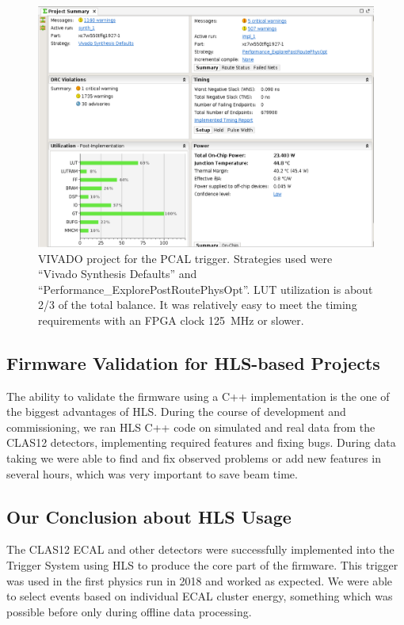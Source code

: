\begin{figure}[hbt]
	\centering
	\includegraphics[width=1.0\columnwidth,keepaspectratio]{img/vivado.png}
	\caption{VIVADO project for the PCAL trigger. Strategies used were ``Vivado Synthesis Defaults'' and ``Performance\_ExplorePostRoutePhysOpt''. LUT utilization is about 2/3 of the total balance. It was relatively easy to meet the timing requirements with an FPGA clock 125~MHz or slower.}
	\label{fig:vivado}
\end{figure}

\subsection{Firmware Validation for HLS-based Projects}

The ability to validate the firmware using a C++ implementation is the one of the biggest advantages of HLS. During the course of development and commissioning, we ran HLS C++ code on simulated and real data from the CLAS12 detectors, implementing required features and fixing bugs. During data taking we were able to find and fix observed problems or add new features in several hours, which was very important to save beam time.

\subsection{Our Conclusion about HLS Usage}

The CLAS12 ECAL and other detectors were successfully implemented into the Trigger System using HLS to produce the core part of the firmware. This trigger was used in the first physics run in 2018 and worked as expected. We were able to select events based on individual ECAL cluster energy, something which was possible before only during offline data processing.

